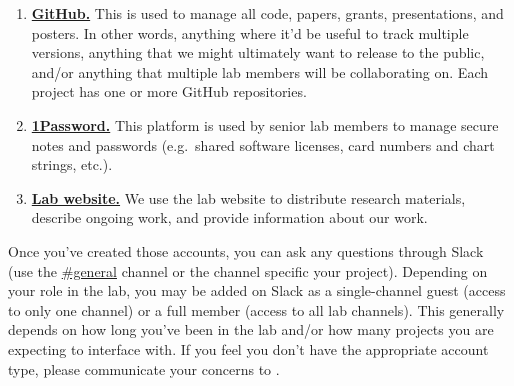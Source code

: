 \documentclass{tufte-book} %
\begin{document}
\begin{enumerate}
\item \href{https://www.github.com}{\textbf{GitHub.}}
    This is used to manage all code, papers, grants,
  presentations, and posters.  In other words, anything where it'd be
  useful to track multiple versions, anything that we might ultimately
  want to release to the public, and/or anything that multiple lab
  members will be collaborating on.  Each project has one or more
  GitHub repositories.
\item \href{https://1password.com/}{\textbf{1Password.}}
   This platform is used by senior
  lab members to manage secure notes and passwords (e.g.\ shared
  software licenses, card numbers and chart strings, etc.).
\item \href{http://www.context-lab.com/}{\textbf{Lab website.}}
   We use the lab website to
  distribute research materials, describe ongoing work, and provide
  information about our work.
\end{enumerate}

Once you've created those accounts, you can ask any questions through
Slack (use the
\href{https://context-lab.slack.com/messages/general/}{\#general}
  channel or the channel specific your project).  Depending on your
role in the lab, you may be added on Slack as a single-channel guest
(access to only one channel) or a full member (access to all lab
channels).  This generally depends on how long you've been in the lab
and/or how many projects you are expecting to interface with.  If you
feel you don't have the appropriate account type, please communicate
your concerns to \director.
\end{document}
